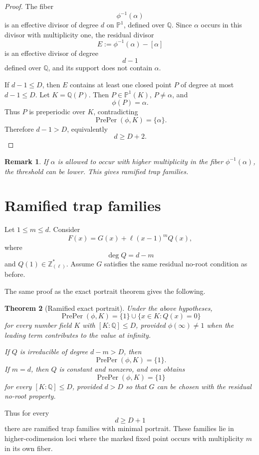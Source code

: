 \documentclass[11pt]{article}
\newtheorem{theorem}{Theorem}[section]
\newtheorem{remark}[theorem]{Remark}
\begin{document}
\begin{proof}
The fiber
\[
\phi^{-1}(\alpha)
\]
is an effective divisor of degree \(d\) on \(\mathbb P^1\), defined over \(\mathbb Q\). Since \(\alpha\) occurs in this divisor with multiplicity one, the residual divisor
\[
E:=\phi^{-1}(\alpha)-[\alpha]
\]
is an effective divisor of degree
\[
d-1
\]
defined over \(\mathbb Q\), and its support does not contain \(\alpha\).

If \(d-1\le D\), then \(E\) contains at least one closed point \(P\) of degree at most \(d-1\le D\). Let \(K=\mathbb Q(P)\). Then \(P\in\mathbb P^1(K)\), \(P\ne\alpha\), and
\[
\phi(P)=\alpha.
\]
Thus \(P\) is preperiodic over \(K\), contradicting
\[
\operatorname{PrePer}(\phi,K)=\{\alpha\}.
\]
Therefore \(d-1>D\), equivalently
\[
d\ge D+2.
\]
\end{proof}

\begin{remark}
If \(\alpha\) is allowed to occur with higher multiplicity in the fiber \(\phi^{-1}(\alpha)\), the threshold can be lower. This gives ramified trap families.
\end{remark}

\section{Ramified trap families}

Let \(1\le m\le d\). Consider
\[
F(x)=G(x)+\ell(x-1)^mQ(x),
\]
where
\[
\deg Q=d-m
\]
and \(Q(1)\in\mathbb Z_{(\ell)}^\ast\). Assume \(G\) satisfies the same residual no-root condition as before.

The same proof as the exact portrait theorem gives the following.

\begin{theorem}[Ramified exact portrait]
Under the above hypotheses,
\[
\operatorname{PrePer}(\phi,K)
=
\{1\}\cup\{x\in K:Q(x)=0\}
\]
for every number field \(K\) with \([K:\mathbb Q]\le D\), provided \(\phi(\infty)\ne1\) when the leading term contributes to the value at infinity.

If \(Q\) is irreducible of degree \(d-m>D\), then
\[
\operatorname{PrePer}(\phi,K)=\{1\}.
\]
If \(m=d\), then \(Q\) is constant and nonzero, and one obtains
\[
\operatorname{PrePer}(\phi,K)=\{1\}
\]
for every \([K:\mathbb Q]\le D\), provided \(d>D\) so that \(G\) can be chosen with the residual no-root property.
\end{theorem}

Thus for every
\[
d\ge D+1
\]
there are ramified trap families with minimal portrait. These families lie in higher-codimension loci where the marked fixed point occurs with multiplicity \(m\) in its own fiber.
\end{document}
